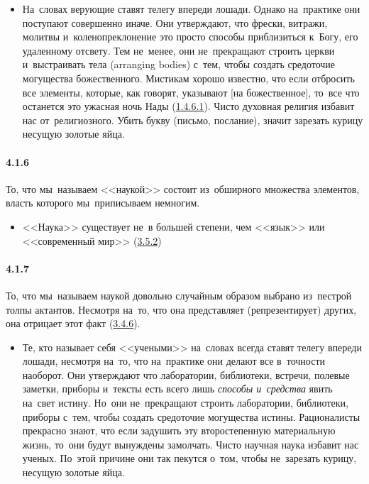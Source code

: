 	\begin{itemize}
	\item 
 На~словах верующие ставят телегу впереди лошади. Однако на~практике они поступают совершенно иначе. Они утверждают, что фрески, витражи, молитвы и~коленопреклонение это просто способы приблизиться к~Богу, его удаленному отсвету. Тем не~менее, они не~прекращают строить церкви и~выстраивать тела (arranging bodies) с~тем, чтобы создать средоточие могущества божественного. Мистикам хорошо известно, что если отбросить все элементы, которые, как говорят, указывают [на божественное], то~все что останется это ужасная ночь Нады (\hyperlink{par:1.4.6.1}{1.4.6.1}). Чисто духовная религия избавит нас от~религиозного. Убить букву (письмо, послание), значит зарезать курицу несущую золотые яйца.
	\end{itemize}	


\paragraph{4.1.6}\hypertarget{par:4.1.6}{} То, что мы~называем <<наукой>> состоит из~обширного множества элементов, власть которого мы~приписываем немногим. 
	\begin{itemize}
	\item 
	<<Наука>> существует не~в большей степени, чем <<язык>> или <<современный мир>> (\hyperlink{par:3.5.2}{3.5.2})
	\end{itemize}	


\paragraph{4.1.7}\hypertarget{par:4.1.7}{} То, что мы~называем наукой довольно случайным образом выбрано из~пестрой толпы актантов. Несмотря на~то, что она представляет (репрезентирует) других, она отрицает этот факт (\hyperlink{par:3.4.6}{3.4.6}). 
	\begin{itemize}
	\item 
	Те, кто называет себя <<учеными>> на~словах всегда ставят телегу впереди лошади, несмотря на~то, что на~практике они делают все в~точности наоборот. Они утверждают что лаборатории, библиотеки, встречи, полевые заметки, приборы и~тексты есть всего лишь {\itshape способы и~средства} явить на~свет истину. Но~они не~прекращают строить лаборатории, библиотеки, приборы с~тем, чтобы создать средоточие могущества истины. Рационалисты прекрасно знают, что если задушить эту второстепенную материальную жизнь, то~они будут вынуждены замолчать. Чисто научная наука избавит нас ученых. По~этой причине они так пекутся о~том, чтобы не~зарезать курицу, несущую золотые яйца.
	\end{itemize}	


